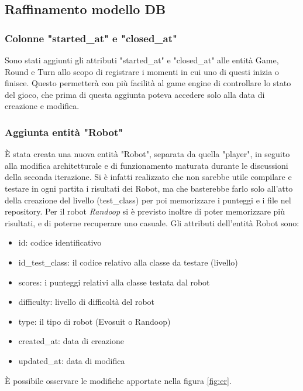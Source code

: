 \documentclass{article}
\begin{document}
\subsection{Raffinamento modello DB}

\subsubsection{Colonne "started\_at" e "closed\_at"}
Sono stati aggiunti gli attributi "started\_at" e "closed\_at" alle entità Game, Round e Turn allo scopo di registrare i momenti in cui uno di questi inizia o finisce.
Questo permetterà con più facilità al game engine di controllare lo stato del gioco, che prima di questa aggiunta poteva accedere solo alla data di creazione e modifica.

\subsubsection{Aggiunta entità "Robot"}
È stata creata una nuova entità "Robot", separata da quella "player", in seguito alla modifica architetturale e di funzionamento maturata durante le discussioni della seconda iterazione. Si è infatti realizzato che non sarebbe utile compilare e testare in ogni partita i risultati dei Robot, ma che basterebbe farlo solo all'atto della creazione del livello (test\_class) per poi memorizzare i punteggi e i file nel repository.
Per il robot \textit{Randoop} si è previsto inoltre di poter memorizzare più risultati, e di poterne recuperare uno casuale.
Gli attributi dell'entità Robot sono:
\begin{itemize}
    \item id: codice identificativo 
    \item id\_test\_class: il codice relativo alla classe da testare (livello)
    \item  scores: i punteggi relativi alla classe testata dal robot
    \item difficulty: livello di difficoltà del robot
    \item type: il tipo di robot (Evosuit o Randoop)
    \item created\_at: data di creazione
    \item updated\_at: data di modifica
\end{itemize}

È possibile osservare le modifiche apportate nella figura \cref{fig:er}. 
\end{document}

